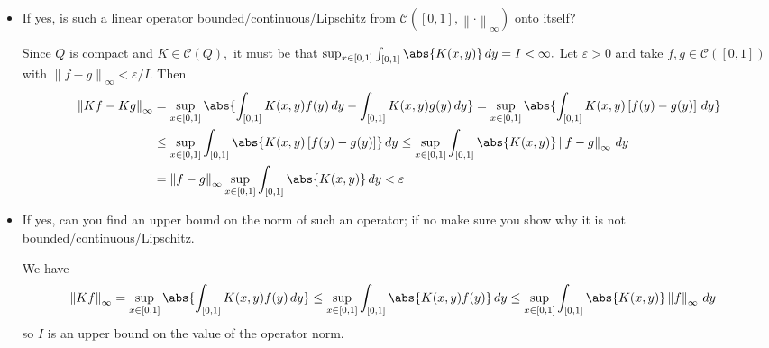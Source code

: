 \documentclass{article}
\begin{document}
\begin{itemize}
	\item If yes, is such a linear operator bounded/continuous/Lipschitz from $\mathcal{C}\left( [0, 1], \left\lVert \cdot \right\rVert_\infty \right)$ onto itself? 
		\begin{answer*}
			Since $Q$ is compact and $K\in\mathcal C(Q),$ it must be that $\sup_{x\in [0, 1]} \int_{[0, 1]} \abs{K(x, y)}\, dy=I<\infty.$ Let $\varepsilon>0$ and take $f, g\in \mathcal C([0, 1])$ with $\left\lVert f-g \right\rVert_\infty<\varepsilon/I.$ Then 
			\begin{align*}
				\left\lVert Kf-Kg \right\rVert_\infty &= \sup_{x\in[0, 1]} \abs{\int_{[0, 1]} K(x, y)f(y)\, dy - \int_{[0, 1]} K(x, y) g(y)\, dy} = \sup_{x\in[0, 1]}\abs{\int_{[0, 1]} K(x, y) \left[ f(y)-g(y) \right]\, dy} \\
				&\le \sup_{x\in[0, 1]}\int_{[0, 1]} \abs{K(x, y) \left[ f(y)-g(y) \right]}\, dy \le \sup_{x\in[0, 1]} \int_{[0, 1]} \abs{K(x, y)} \left\lVert f-g \right\rVert_\infty\, dy \\
				& =\left\lVert f-g \right\rVert_\infty \sup_{x\in[0, 1]} \int_{[0, 1]} \abs{K(x, y)}\, dy < \varepsilon
			\end{align*}
		\end{answer*}

	\item If yes, can you find an upper bound on the norm of such an operator; if no make sure you show why it is not bounded/continuous/Lipschitz. 
		\begin{answer*}
			We have
			\begin{align*}
				\left\lVert Kf \right\rVert_\infty &= \sup_{x\in[0, 1]} \abs{\int_{[0, 1]} K(x, y)f(y)\, dy} \le \sup_{x\in[0, 1]} \int_{[0, 1]} \abs{K(x, y)f(y)}\, dy \le \sup_{x\in[0, 1]}\int_{[0, 1]} \abs{K(x, y)}\left\lVert f \right\rVert_\infty \, dy
			\end{align*}
			so $I$ is an upper bound on the value of the operator norm.
		\end{answer*}


\end{itemize}
\end{document}
